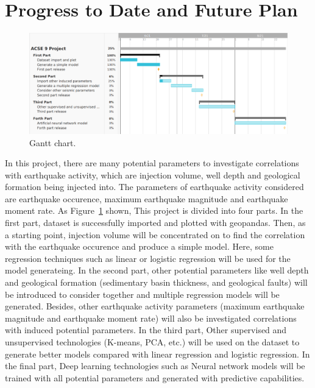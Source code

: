 \documentclass[project-plan]{report-template}
\begin{document}
\section{Progress to Date and Future Plan}
\begin{figure}
    \begin{center}
        \includegraphics[width=1\textwidth]{gantt.png}
    \end{center}
    \caption{\label{fig:gantt} Gantt chart.}
\end{figure}
In this project, there are many potential parameters to investigate correlations with earthquake activity, which are injection volume, well depth and geological formation being injected into.
The parameters of earthquake activity considered are earthquake occurence, maximum earthquake magnitude and earthquake moment rate.
As Figure~\ref{fig:gantt} shown, This project is divided into four parts.
In the first part, dataset is successfully imported and plotted with geopandas. Then, as a starting point, injection volume will be concentrated on to find the correlation with the earthquake occurence and produce a simple model. 
Here, some regression techniques such as linear or logistic regression will be used for the model generateing.
In the second part, other potential parameters like well depth and geological formation (sedimentary basin thickness, and geological faults) will be introduced to consider together and multiple regression models will be generated.
Besides, other earthquake activity parameters (maximum earthquake magnitude and earthquake moment rate) will also be investigated correlations with induced potential parameters.
In the third part, Other supervised and unsupervised technologies (K-means, PCA, etc.) will be used on the dataset to generate better models compared with linear regression and logistic regression.
In the final part, Deep learning technologies such as Neural network models will be trained with all potential parameters and generated with predictive capabilities.
\end{document}
